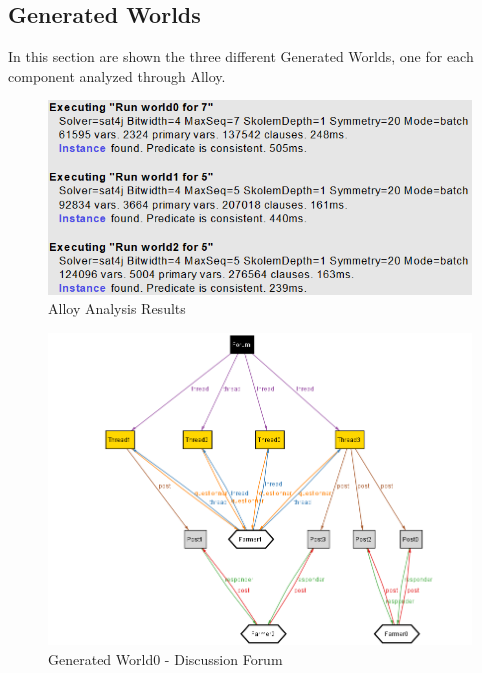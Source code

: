 \subsection{Generated Worlds}

In this section are shown the three different Generated Worlds, one for each component analyzed through Alloy.\\



\begin{figure}[H]
  \includegraphics[width=\textwidth,height=\textheight,keepaspectratio]{./Images/Alloy/predicatesExecution.png}
  \caption{Alloy Analysis Results}
\end{figure}

\newpage
{}
\recalctypearea
\begin{center}
\begin{figure}
    \includegraphics[width=\textwidth]{./Images/Alloy/DiscussionForum.png}
    \caption{Generated World0 - Discussion Forum}
    \label{fig:LandscapeFigure}
\end{figure}
\end{center}


